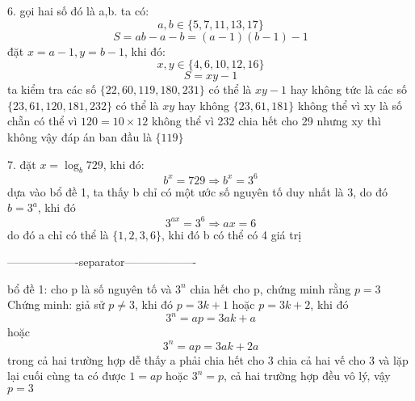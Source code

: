 \documentclass{article}
\begin{document}
6. gọi hai số đó là a,b. ta có:
\[a,b \in \{5, 7, 11, 13, 17\}\]
\[S=ab-a-b=(a-1)(b-1)-1\]
đặt $x=a-1, y=b-1$, khi đó:
\[x,y \in \{4, 6, 10, 12, 16\}\]
\[S=xy-1\]
ta kiểm tra các số $\{22, 60, 119, 180, 231\}$ có thể là $xy-1$ hay không tức là 
các số $\{23, 61, 120, 181, 232\}$ có thể là $xy$ hay không
\newline
$\{23, 61, 181\}$ không thể vì xy là số chẵn
 có thể vì $120=10 \times 12$
 không thể vì 232 chia hết cho 29 nhưng xy thì không
\newline
vậy đáp án ban đầu là $\{119\}$













7. đặt $x=\log_{b}{729}$, khi đó:
\[b^x=729 \Rightarrow b^x=3^6\]
dựa vào bổ đề 1, ta thấy b chỉ có một ước số nguyên tố duy nhất là 3, do đó $b=3^a$, khi đó
\[3^{ax}=3^6 \Rightarrow ax=6\]
do đó a chỉ có thể là $\{1, 2, 3, 6\}$, khi đó b có thể có 4 giá trị

-------------------separator-------------------

bổ đề 1: cho p là số nguyên tố và $3^n$ chia hết cho p, chứng minh rằng $p=3$
Chứng minh: giả sử $p\neq 3$, khi đó $p=3k+1$ hoặc $p=3k+2$, khi đó
\[3^n=ap=3ak+a\]
hoặc
\[3^n=ap=3ak+2a\]
trong cả hai trường hợp dễ thấy a phải chia hết cho 3
chia cả hai vế cho 3 và lặp lại cuối cùng ta có được
$1=ap$ hoặc $3^n=p$, cả hai trường hợp đều vô lý, vậy $p=3$
\end{document}
